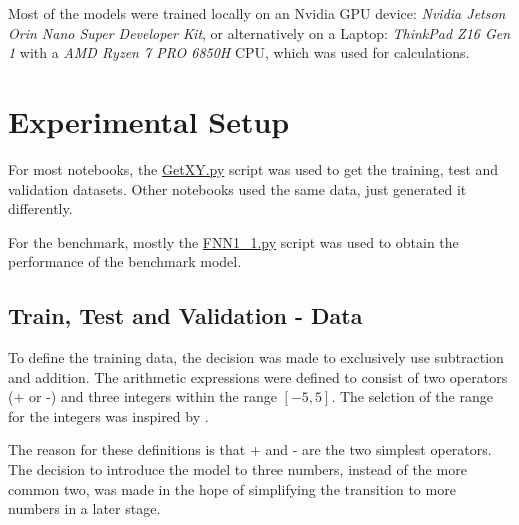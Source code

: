 \documentclass{article}
\begin{document}
Most of the models were trained locally on an Nvidia GPU device: \textit{Nvidia Jetson Orin Nano Super Developer Kit}, or alternatively on a Laptop: \textit{ThinkPad Z16 Gen 1} with a \textit{AMD Ryzen 7 PRO 6850H} CPU, which was used for calculations.


\section{Experimental Setup}

For most notebooks, the \href{https://github.com/AntonStantan/matura/blob/main/GetXY.py}{GetXY.py} script was used to get the training, test and validation datasets. Other notebooks used the same data, just generated it differently.

For the benchmark, mostly the \href{https://github.com/AntonStantan/matura/blob/main/FNN1_1.py}{FNN1\_1.py} script was used to obtain the performance of the benchmark model.

\subsection{Train, Test and Validation - Data} \label{sec:ttvData}

To define the training data, the decision was made to exclusively use subtraction and addition. The arithmetic expressions were defined to consist of two operators (+ or -) and three integers within the range $[-5, 5]$. The selction of the range for the integers was inspired by \cite{trask2018neuralarithmeticlogicunits}.

The reason for these definitions is that + and - are the two simplest operators. The decision to introduce the model to three numbers, instead of the more common two, was made in the hope of simplifying the transition to more numbers in a later stage.
\end{document}
